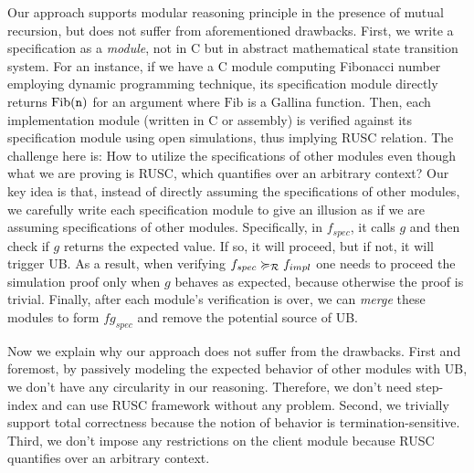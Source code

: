 {







Our approach supports modular reasoning principle in the presence of mutual recursion, but does not suffer from aforementioned drawbacks.
First, we write a specification as a {\it module}, not in C but in abstract mathematical state transition system. %
For an instance, if we have a C module computing Fibonacci number employing dynamic programming technique, its specification module directly returns $\mathrm{Fib}(\texttt{n})$ for an argument  where $\mathrm{Fib}$ is a Gallina function.
Then, each implementation module (written in C or assembly) is verified against its specification module using open simulations, thus implying RUSC relation.
The challenge here is: How to utilize the specifications of other modules even though what we are proving is RUSC, which quantifies over an arbitrary context?
Our key idea is that, instead of directly assuming the specifications of other modules, we carefully write each specification module to give an illusion as if we are assuming specifications of other modules.
Specifically, in $f_{spec}$, it calls $g$ and then check if $g$ returns the expected value. If so, it will proceed, but if not, it will trigger UB.
As a result, when verifying $f_{spec} \succcurlyeq_{\mathcal{R}} f_{impl}$ one needs to proceed the simulation proof only when $g$ behaves as expected, because otherwise the proof is trivial.
Finally, after each module's verification is over, we can {\it merge} these modules to form $fg_{spec}$ and remove the potential source of UB.


\noindent Now we explain why our approach does not suffer from the drawbacks.
First and foremost, by passively modeling the expected behavior of other modules with UB, we don't have any circularity in our reasoning. Therefore, we don't need step-index and can use RUSC framework without any problem.
Second, we trivially support total correctness because the notion of behavior is termination-sensitive.
Third, we don't impose any restrictions on the client module because RUSC quantifies over an arbitrary context.
}




